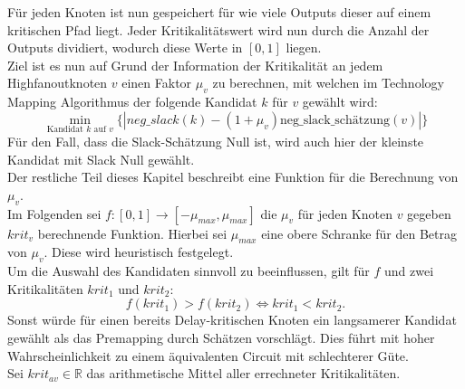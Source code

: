 \documentclass[11pt, a4paper, german]{article}
\newcommand{\TM}{Technology  Mapping }
\begin{document}
Für jeden Knoten ist nun gespeichert für wie viele Outputs dieser auf einem kritischen Pfad liegt. Jeder Kritikalitätswert wird nun durch die Anzahl der Outputs dividiert, wodurch diese Werte in $[0,1]$ liegen.\\

Ziel ist es nun auf Grund der Information der Kritikalität an jedem Highfanoutknoten $v$ einen Faktor $\mu_v$ zu berechnen, mit welchen im \TM Algorithmus der folgende Kandidat $k$ für $v$  gewählt wird: 
\[\min\limits_{\text{Kandidat }k\text{ auf }v}\{|neg\_slack(k)-(1+\mu_v)\text{neg\_slack\_sch\"atzung}(v)|\}\]
Für den Fall, dass die Slack-Schätzung Null ist, wird auch hier der kleinste Kandidat mit Slack Null gewählt.\\

Der restliche Teil dieses Kapitel beschreibt eine Funktion für die Berechnung von $\mu_v$.\\
Im Folgenden sei $f: [0,1] \rightarrow[-\mu_{max}, \mu_{max}]$ die $\mu_v$ für jeden Knoten $v$ gegeben $krit_v$ berechnende Funktion. Hierbei sei  $\mu_{max}$ eine obere Schranke für den Betrag von $\mu_v$. Diese wird heuristisch festgelegt. \\
Um die Auswahl des Kandidaten sinnvoll zu beeinflussen, gilt für $f$ und zwei Kritikalitäten $krit_1$ und $krit_2$:
\[f(krit_1) > f(krit_2) \Leftrightarrow krit_1 < krit_2.\]
Sonst würde für einen bereits Delay-kritischen Knoten ein langsamerer Kandidat gewählt als das Premapping durch Schätzen vorschlägt. Dies führt mit hoher Wahrscheinlichkeit zu einem äquivalenten Circuit mit schlechterer Güte.\\
Sei $krit_{av} \in \mathbb{R}$ das arithmetische Mittel aller errechneter Kritikalitäten. \\
\end{document}
